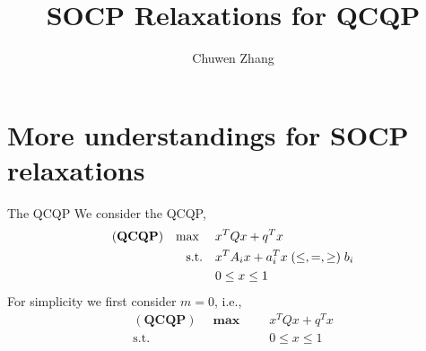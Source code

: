 \documentclass[aspectratio=1612, 10pt]{beamer}
\newcommand{\model}[1]{(\textbf{#1})}
\newcommand{\mx}{\mathbf{\max}\;}
\begin{document}
\title{SOCP Relaxations for QCQP}

\author{
  Chuwen Zhang
}


\maketitle

\section{More understandings for SOCP relaxations}

\begin{frame}{The QCQP}
  We consider the QCQP,
  \begin{equation}
    \label{eq:inhoqcqp}
    \begin{aligned}
      \model{QCQP} \quad \mx \quad & x^T Qx + q^T x                                    \\
      \textrm{s.t.} \quad          & x^T A_i x + a_i^T x \hspace{0.27em} (\le, =, \ge)
      \hspace{0.27em} b_i                                                              \\
                                   & 0 \le x \le 1
    \end{aligned}
  \end{equation}
  For simplicity we first consider \(m = 0\), i.e.,
  \begin{equation}
    \label{eq:inhoqcqp.box}
    \begin{aligned}
      \model{QCQP} \quad \mx \quad & x^T Qx + q^T x \\
      \textrm{s.t.} \quad          & 0 \le x \le 1
    \end{aligned}
  \end{equation}
\end{frame}
\end{document}

